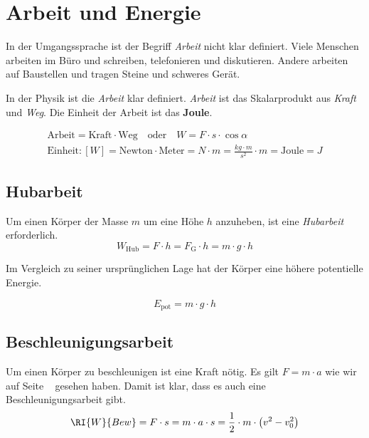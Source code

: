 \section*{Arbeit und Energie}
In der Umgangssprache ist der Begriff \emph{Arbeit} nicht klar definiert.
Viele Menschen arbeiten im Büro und schreiben, telefonieren und diskutieren.
Andere arbeiten auf Baustellen und tragen Steine und schweres Gerät.

In der Physik ist die \emph{Arbeit} klar definiert.
\emph{Arbeit} ist das Skalarprodukt aus \emph{Kraft} und \emph{Weg}.
Die Einheit der Arbeit ist das {\bf Joule}.

\begin{cbox}
\begin{gather*}
    \text{Arbeit} = \text{Kraft}\cdot{\text{Weg}}\quad\text{oder}\quad W=F\cdot s\cdot \cos \alpha\\
	\text{Einheit}: [W] = \text{Newton}\cdot\text{Meter}=\si{N}\cdot\si{m}=\frac{\si{kg}\cdot\si{m}}{\si{s^2}}\cdot \si{m}=\text{Joule}=\si{J}
\end{gather*}
\end{cbox}



\subsection*{Hubarbeit}
Um einen Körper der Masse $m$ um eine Höhe $h$ anzuheben, ist eine \emph{Hubarbeit} erforderlich.
\begin{equation*}
	W_{\text{Hub}} = F \cdot h = F_{\text{G}}\cdot h = m\cdot g\cdot h
\end{equation*}

Im Vergleich zu seiner ursprünglichen Lage hat der Körper eine höhere potentielle Energie.

\begin{cbox}
\begin{equation*}
	E_{\text{pot}} = m\cdot g\cdot h
\end{equation*}
\end{cbox}






\subsection*{Beschleunigungsarbeit}
Um einen Körper zu beschleunigen ist eine Kraft nötig. Es gilt $F=m\cdot a$ wie wir auf Seite ~\pageref{newton2} gesehen haben.
Damit ist klar, dass es auch eine Beschleunigungsarbeit gibt.
\begin{eqnarray*}
	\RI{W}{Bew}=F\cdot s=m\cdot a\cdot s=\frac{1}{2}\cdot m\cdot\left(v^2-v_0^2\right)
\end{eqnarray*}

